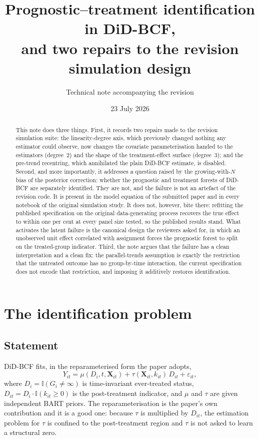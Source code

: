 \documentclass[11pt]{article}
\title{Prognostic--treatment identification in DiD-BCF,\\
       and two repairs to the revision simulation design}
\author{Technical note accompanying the revision}
\date{23 July 2026}
\newcommand{\Xb}{\mathbf{X}}
\begin{document}
\maketitle

\begin{abstract}
This note does three things. First, it records two repairs made to the revision
simulation suite: the linearity-degree axis, which previously changed nothing
any estimator could observe, now changes the covariate parameterisation handed
to the estimators (degree~2) and the shape of the treatment-effect surface
(degree~3); and the pre-trend recentring, which annihilated the plain DiD-BCF
estimate, is disabled. Second, and more importantly, it addresses a question
raised by the growing-with-$N$ bias of the posterior correction: whether the
prognostic and treatment forests of DiD-BCF are separately identified. They are
not, and the failure is not an artefact of the revision code. It is present in
the model equation of the submitted paper and in every notebook of the original
simulation study. It does not, however, bite there: refitting the published
specification on the original data-generating process recovers the true effect
to within one per cent at every panel size tested, so the published results
stand. What activates the latent failure is the canonical design the reviewers
asked for, in which an unobserved unit effect correlated with assignment forces
the prognostic forest to split on the treated-group indicator. Third, the note
argues that the failure has a clean interpretation and a clean fix: the
parallel-trends assumption is exactly the restriction that the untreated
outcome has no group-by-time interaction, the current specification does not
encode that restriction, and imposing it additively restores identification.
\end{abstract}

\section{The identification problem}

\subsection{Statement}

DiD-BCF fits, in the reparameterised form the paper adopts,
\begin{equation}\label{eq:model}
  Y_{it} = \mu(D_i, t, \Xb_{it}) + \tau(\Xb_{it}, k_{it})\, D_{it}
           + \varepsilon_{it},
\end{equation}
where $D_i = \mathbb{I}(G_i \neq \infty)$ is time-invariant ever-treated status,
$D_{it} = D_i \cdot \mathbb{I}(k_{it} \geq 0)$ is the post-treatment indicator,
and $\mu$ and $\tau$ are given independent BART priors. The reparameterisation
is the paper's own contribution and it is a good one: because $\tau$ is
multiplied by $D_{it}$, the estimation problem for $\tau$ is confined to the
post-treatment region and $\tau$ is not asked to learn a structural zero.
\end{document}
